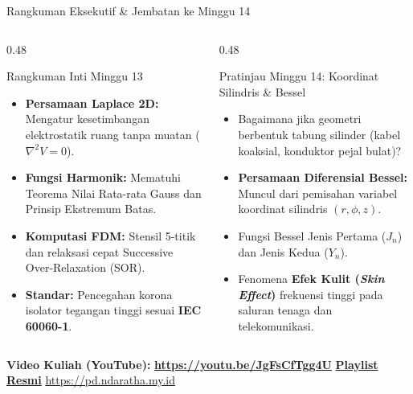 \documentclass[aspectratio=169,10pt]{beamer}
\begin{document}
\begin{frame}{Rangkuman Eksekutif \& Jembatan ke Minggu 14}
  \begin{columns}[t]
    \begin{column}{0.48\textwidth}
      \begin{block}{Rangkuman Inti Minggu 13}
        \begin{itemize}
          \item \textbf{Persamaan Laplace 2D:} Mengatur kesetimbangan elektrostatik ruang tanpa muatan ($\nabla^2 V = 0$).
          \item \textbf{Fungsi Harmonik:} Mematuhi Teorema Nilai Rata-rata Gauss dan Prinsip Ekstremum Batas.
          \item \textbf{Komputasi FDM:} Stensil 5-titik dan relaksasi cepat Successive Over-Relaxation (SOR).
          \item \textbf{Standar:} Pencegahan korona isolator tegangan tinggi sesuai \textbf{IEC 60060-1}.
        \end{itemize}
      \end{block}
    \end{column}
    \begin{column}{0.48\textwidth}
      \begin{alertblock}{Pratinjau Minggu 14: Koordinat Silindris \& Bessel}
        \begin{itemize}
          \item Bagaimana jika geometri berbentuk tabung silinder (kabel koaksial, konduktor pejal bulat)?
          \item \textbf{Persamaan Diferensial Bessel:} Muncul dari pemisahan variabel koordinat silindris $(r, \phi, z)$.
          \item Fungsi Bessel Jenis Pertama ($J_n$) dan Jenis Kedua ($Y_n$).
          \item Fenomena \textbf{Efek Kulit (\textit{Skin Effect})} frekuensi tinggi pada saluran tenaga dan telekomunikasi.
        \end{itemize}
      \end{alertblock}
    \end{column}
  \end{columns}
  \vspace{0.06cm}
  \begin{center}
    \scriptsize \textbf{Video Kuliah (YouTube):} {\color{red!80!black}\textbf{\url{https://youtu.be/JgFsCfTgg4U}}} \quad \textbar \quad \href{https://www.youtube.com/playlist?list=PLS5oOZWXZeTw}{\color{unibblue}\textbf{Playlist Resmi}} \quad \textbar \quad \url{https://pd.ndaratha.my.id}
  \end{center}
\end{frame}
\end{document}
